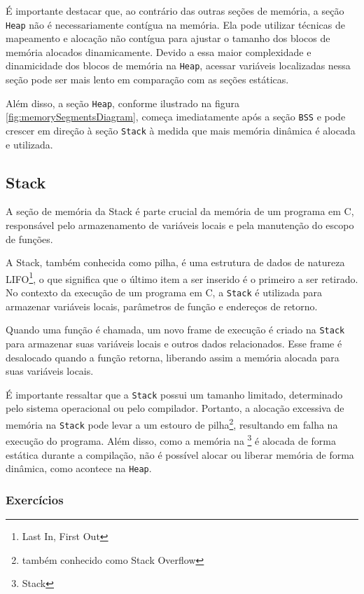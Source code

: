 É importante destacar que, ao contrário das outras seções de memória, a seção \texttt{Heap} não é necessariamente contígua na memória. Ela pode utilizar técnicas de mapeamento e alocação não contígua para ajustar o tamanho dos blocos de memória alocados dinamicamente. Devido a essa maior complexidade e dinamicidade dos blocos de memória na \texttt{Heap}, acessar variáveis localizadas nessa seção pode ser mais lento em comparação com as seções estáticas.

Além disso, a seção \texttt{Heap}, conforme ilustrado na figura \ref{fig:memorySegmentsDiagram}, começa imediatamente após a seção \texttt{BSS} e pode crescer em direção à seção \texttt{Stack} à medida que mais memória dinâmica é alocada e utilizada.

\subsection{Stack}

A seção de memória da Stack é parte crucial da memória de um programa em C, 
responsável pelo armazenamento de variáveis locais e pela manutenção do escopo 
de funções.

A Stack, também conhecida como pilha, é uma estrutura de dados de natureza 
LIFO\footnote{Last In, First Out}, o que significa que o último item a ser 
inserido é o primeiro a ser retirado. No contexto da execução de um programa em 
C, a \texttt{Stack} é utilizada para armazenar variáveis locais, parâmetros de 
função e endereços de retorno.

Quando uma função é chamada, um novo frame de execução é criado na \texttt{Stack} 
para armazenar suas variáveis locais e outros dados relacionados. Esse frame é 
desalocado quando a função retorna, liberando assim a memória alocada para suas 
variáveis locais.

É importante ressaltar que a \texttt{Stack} possui um tamanho limitado, 
determinado pelo sistema operacional ou pelo compilador. Portanto, a alocação 
excessiva de memória na \texttt{Stack} pode levar a um estouro de 
pilha\footnote{também conhecido como Stack Overflow}, resultando em falha na 
execução do programa. Além disso, como a memória na \footnote{Stack} é alocada 
de forma estática durante a compilação, não é possível alocar ou liberar memória 
de forma dinâmica, como acontece na \texttt{Heap}.

\subsubsection{Exercícios}

